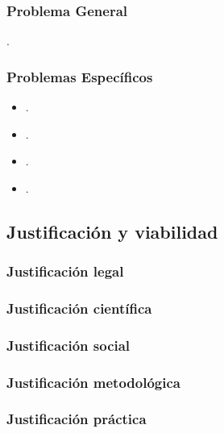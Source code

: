 \documentclass[12pt,a4paper]{article}
\begin{document}
\subsubsection{Problema General}
\problema.
\subsubsection{Problemas Específicos}
\begin{itemize}
	\item \problemae.
	\item \problemaee.
	\item \problemaeee.
	\item \problemaeeee.
\end{itemize}


\subsection{Justificación y viabilidad}

\subsubsection{Justificación legal}

\subsubsection{Justificación científica}

\subsubsection{Justificación social}

\subsubsection{Justificación metodológica}

\subsubsection{Justificación práctica}
\end{document}
